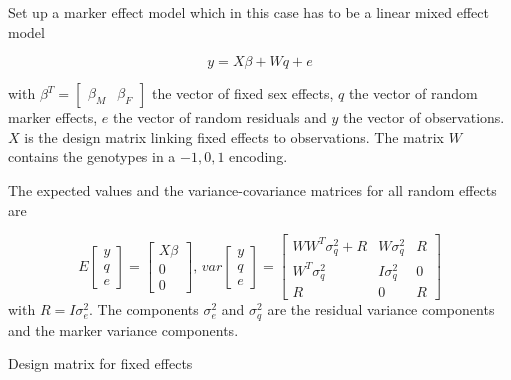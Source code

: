 \documentclass[
]{article}
\newenvironment{Shaded}{\begin{snugshade}}{\end{snugshade}}
\newcommand{\AttributeTok}[1]{\textcolor[rgb]{0.77,0.63,0.00}{#1}}
\newcommand{\CommentTok}[1]{\textcolor[rgb]{0.56,0.35,0.01}{\textit{#1}}}
\newcommand{\ConstantTok}[1]{\textcolor[rgb]{0.00,0.00,0.00}{#1}}
\newcommand{\DecValTok}[1]{\textcolor[rgb]{0.00,0.00,0.81}{#1}}
\newcommand{\FunctionTok}[1]{\textcolor[rgb]{0.00,0.00,0.00}{#1}}
\newcommand{\NormalTok}[1]{#1}
\newcommand{\OtherTok}[1]{\textcolor[rgb]{0.56,0.35,0.01}{#1}}
\newcommand{\SpecialCharTok}[1]{\textcolor[rgb]{0.00,0.00,0.00}{#1}}
\newcommand{\StringTok}[1]{\textcolor[rgb]{0.31,0.60,0.02}{#1}}
\begin{document}
Set up a marker effect model which in this case has to be a linear mixed
effect model

\[y = X\beta + Wq + e\]

with
\(\beta^T = \left[ \begin{array}{cc} \beta_M & \beta_F \end{array} \right]\)
the vector of fixed sex effects, \(q\) the vector of random marker
effects, \(e\) the vector of random residuals and \(y\) the vector of
observations. \(X\) is the design matrix linking fixed effects to
observations. The matrix \(W\) contains the genotypes in a \(-1,0,1\)
encoding.

The expected values and the variance-covariance matrices for all random
effects are

\[
E\left[ \begin{array}{c}y \\ q \\ e \end{array}\right] = \left[ \begin{array}{c} X\beta \\ 0 \\ 0 \end{array}\right] \text{, }
var\left[ \begin{array}{c}y \\ q \\ e \end{array}\right] = \left[ \begin{array}{ccc} WW^T \sigma_q^2 + R &  W \sigma_q^2 & R  \\ W^T \sigma_q^2 & I \sigma_q^2 & 0 \\ R & 0 & R \end{array}\right]
\] with \(R = I\sigma_e^2\). The components \(\sigma_e^2\) and
\(\sigma_q^2\) are the residual variance components and the marker
variance components.

Design matrix for fixed effects

\begin{Shaded}
\end{Shaded}
\end{document}
